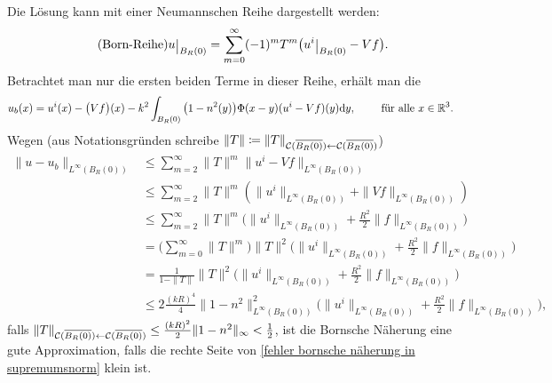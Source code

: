 Die Lösung kann mit einer Neumannschen Reihe dargestellt werden:
\begin{equation*}
	\tag{Born-Reihe}
	u\restrict{B_R(0)}=\sum_{m=0}^\infty(-1)^{m}T^m\big(u^i\restrict{B_R(0)}-Vf\big).
\end{equation*}
Betrachtet man nur die ersten beiden Terme in dieser Reihe, erhält man die 
\begin{equation*}
	u_b(x)=u^i(x)-\big(Vf\big)(x)-k^2\int_{B_R(0)}\big(1-n^2(y)\big)\Phi(x-y)(u^i-Vf)(y)\mathrm{d}y,\qquad\text{ für alle }x\in\mathbb{R}^3.
\end{equation*}
Wegen (aus Notationsgründen schreibe \(\|T\|\coloneqq \|T\|_{\mathcal{C}(\overline{B_R(0)})\leftarrow\mathcal{C}(\overline{B_R(0)})}\))
\begin{equation}
	\label{fehler bornsche näherung in supremumsnorm}
	\begin{aligned}
		\|u-u_b\|_{L^\infty(B_R(0))}
		&\leq\sum_{m=2}^\infty\|T\|^m\|u^i-Vf\|_{L^\infty(B_R(0))}\\
		&\leq\sum_{m=2}^\infty\|T\|^m(\|u^i\|_{L^\infty(B_R(0))}+\|Vf\|_{L^\infty(B_R(0))})\\
		&\leq\sum_{m=2}^\infty\|T\|^m\Big(\|u^i\|_{L^\infty(B_R(0))}+\frac{R^2}{2}\|f\|_{L^\infty(B_R(0))}\Big)\\
		&=\Big(\sum_{m=0}^\infty\|T\|^m\Big)\|T\|^2\Big(\|u^i\|_{L^\infty(B_R(0))}+\frac{R^2}{2}\|f\|_{L^\infty(B_R(0))}\Big)\\
		&=\frac{1}{1-\|T\|}\|T\|^2\Big(\|u^i\|_{L^\infty(B_R(0))}+\frac{R^2}{2}\|f\|_{L^\infty(B_R(0))}\Big)\\
		&\leq2\frac{(kR)^4}{4}\|1-n^2\|_{L^\infty(B_R(0))}^2\Big(\|u^i\|_{L^\infty(B_R(0))}+\frac{R^2}{2}\|f\|_{L^\infty(B_R(0))}\Big),
	\end{aligned}
\end{equation}
falls \(\|T\|_{\mathcal{C}(\overline{B_R(0)})\leftarrow\mathcal{C}(\overline{B_R(0)})}\leq\frac{(kR)^2}{2}\|1-n^2\|_\infty<\frac{1}{2}\), ist die Bornsche Näherung eine gute Approximation, falls die rechte Seite von \eqref{fehler bornsche näherung in supremumsnorm} klein ist.

